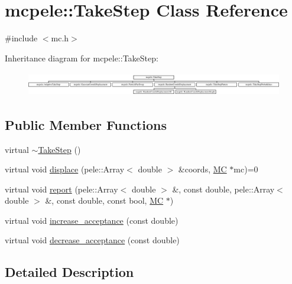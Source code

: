 \hypertarget{classmcpele_1_1TakeStep}{\section{mcpele\-:\-:\-Take\-Step \-Class \-Reference}
\label{classmcpele_1_1TakeStep}
}


{\ttfamily \#include $<$mc.\-h$>$}

\-Inheritance diagram for mcpele\-:\-:\-Take\-Step\-:\begin{figure}[H]
\begin{center}
\leavevmode
\includegraphics[height=1.068702cm]{classmcpele_1_1TakeStep}
\end{center}
\end{figure}
\subsection*{\-Public \-Member \-Functions}
\begin{DoxyCompactItemize}
\item 
virtual \hyperlink{classmcpele_1_1TakeStep_a82aab5c2527f8a7fd4c0f8a438dc3625}{$\sim$\-Take\-Step} ()
\item 
virtual void \hyperlink{classmcpele_1_1TakeStep_ac3032e0d99d4aa5f940ffea4a28442f5}{displace} (pele\-::\-Array$<$ double $>$ \&coords, \hyperlink{classmcpele_1_1MC}{\-M\-C} $\ast$mc)=0
\item 
virtual void \hyperlink{classmcpele_1_1TakeStep_aac4f30de62c4cbc4d9d31c7629742f64}{report} (pele\-::\-Array$<$ double $>$ \&, const double, pele\-::\-Array$<$ double $>$ \&, const double, const bool, \hyperlink{classmcpele_1_1MC}{\-M\-C} $\ast$)
\item 
virtual void \hyperlink{classmcpele_1_1TakeStep_afa92f5196e0304d6ad910304b188c705}{increase\-\_\-acceptance} (const double)
\item 
virtual void \hyperlink{classmcpele_1_1TakeStep_a492ccf2a2e3b3d8ef2224947d0385d77}{decrease\-\_\-acceptance} (const double)
\end{DoxyCompactItemize}


\subsection{\-Detailed \-Description}


